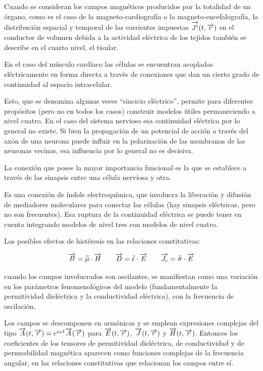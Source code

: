 Cuando se consideran los campos magnéticos producidos por la totalidad de un órgano, como es el caso de la magneto-cardiografía o la magneto-encefalografía, la distribución espacial y temporal de las corrientes impuestas $\overrightarrow{J^{i}}(t, \overrightarrow{r})$ en el conductor de volumen debida a la actividad eléctrica de los tejidos también se describe en el cuarto nivel, el tisular.

En el caso del músculo cardíaco las células se encuentran acopladas eléctricamente en forma directa a través de conexiones que dan un cierto grado de continuidad al espacio intracelular.

Esto, que se denomina algunas veces “sincicio eléctrico”, permite para diferentes propósitos (pero no en todos los casos) construir modelos útiles permaneciendo a nivel cuatro.
En el caso del sistema nervioso esa continuidad eléctrica por lo general no existe.
Si bien la propagación de un potencial de acción a través del axón de una neurona puede influir en la polarización de las membranas de las neuronas vecinas, esa influencia por lo general no es decisiva.

La conexión que posee la mayor importancia funcional es la que se establece a través de las sinapsis entre una célula nerviosa y otra.

Es una conexión de índole electroquímica, que involucra la liberación y difusión de mediadores moleculares para conectar las células (hay sinapsis eléctricas, pero no son frecuentes).
Esa ruptura de la continuidad eléctrica se puede tener en cuenta integrando modelos de nivel tres con modelos de nivel cuatro.

Los posibles efectos de histéresis en las relaciones constitutivas:

\begin{equation}
\overrightarrow{B} = \bar{\bar{\mu}}\cdot \overrightarrow{H} 
	\quad\quad
	\overrightarrow{D}    = \bar{\bar{\epsilon}} \cdot \overrightarrow{E} 
	\quad\quad
	\overrightarrow{J_{c}}= \bar{\bar{\sigma}}   \cdot \overrightarrow{E}
\end{equation}

cuando los campos involucrados son oscilantes, se manifiestan como una variación en los parámetros fenomenológicos del modelo (fundamentalmente la permitividad dieléctrica y la conductividad eléctrica), con la frecuencia de oscilación.

Los campos se descomponen en armónicas y se emplean expresiones complejas del tipo $\overrightarrow{A}(t, \overrightarrow{r})= e^{i\omega t} \overrightarrow{A}(\overrightarrow{r})$ para $\overrightarrow{E}(t, \overrightarrow{r})$, $\overrightarrow{J}(t, \overrightarrow{r})$ y $\overrightarrow{H}(t, \overrightarrow{r})$. Entonces los coeficientes de los tensores de permitividad dieléctrica, de conductividad y de permeabilidad magnética aparecen como funciones complejas de la frecuencia angular, en las relaciones constitutivas que relacionan los campos entre sí.

